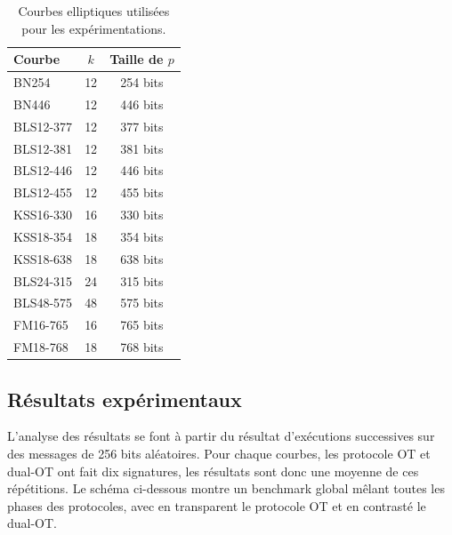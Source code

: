 \documentclass[10pt,a4paper]{article}
\theoremstyle{definition}
\theoremstyle{plain}
\theoremstyle{remark}
\begin{document}
\begin{table}[H]
\centering
\setlength{\tabcolsep}{10pt}
\renewcommand{\arraystretch}{0.9}
\begin{tabular}{lcc}

\toprule

\textbf{Courbe} & \textbf{$k$} & \textbf{Taille de $p$} \\

\midrule

BN254       & 12 & 254 bits \\
BN446       & 12 & 446 bits \\

\midrule

BLS12-377   & 12 & 377 bits \\
BLS12-381   & 12 & 381 bits \\
BLS12-446   & 12 & 446 bits \\
BLS12-455   & 12 & 455 bits \\

\midrule

KSS16-330   & 16 & 330 bits \\

\midrule

KSS18-354   & 18 & 354 bits \\
KSS18-638   & 18 & 638 bits \\

\midrule

BLS24-315   & 24 & 315 bits \\

\midrule

BLS48-575   & 48 & 575 bits \\

\midrule

FM16-765    & 16 & 765 bits \\
FM18-768    & 18 & 768 bits \\

\bottomrule

\end{tabular}

\caption{Courbes elliptiques utilisées pour les expérimentations.}
\label{tab:curves}
\end{table}

\subsection{Résultats expérimentaux}

L'analyse des résultats se font à partir du résultat d'exécutions successives sur des messages de 256 bits aléatoires.
Pour chaque courbes, les protocole OT et dual-OT ont fait dix signatures, les résultats sont 
donc une moyenne de ces répétitions. Le schéma ci-dessous montre un benchmark global
mêlant toutes les phases des protocoles, avec en transparent le protocole OT et en 
contrasté le dual-OT.
\end{document}
